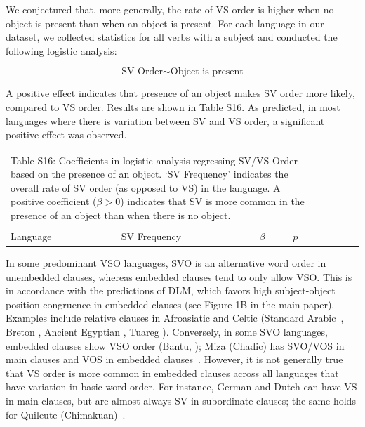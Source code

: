 \documentclass[11pt,a4paper]{article}
\begin{document}

We conjectured that, more generally, the rate of VS order is higher when no object is present than when an object is present.
For each language in our dataset, we collected statistics for all verbs with a subject and conducted the following logistic analysis:

\begin{equation}
\text{SV Order} \sim \text{Object is present}
\end{equation}

A positive effect indicates that presence of an object makes SV order more likely, compared to VS order.
Results are shown in Table S16.
As predicted, in most languages where there is variation between SV and VS order, a significant positive effect was observed.

\begin{longtable}{l|lllllll}
	\multicolumn{4}{p{0.8\textwidth}}{Table S16: Coefficients in logistic analysis regressing SV/VS Order based on the presence of an object. `SV Frequency' indicates the overall rate of SV order (as opposed to VS) in the language. A positive coefficient ($\beta > 0$) indicates that SV is more common in the presence of an object than when there is no object.}
	\\
		\multicolumn{4}{p{0.8\textwidth}}{}\\
Language & SV Frequency & $\beta$ & $p$ \\ \hline

\end{longtable}




In some predominant VSO languages, SVO is an alternative word order in unembedded clauses, whereas embedded clauses tend to only allow VSO.
This is in accordance with the predictions of DLM, which favors high subject-object position congruence in embedded clauses (see Figure 1B in the main paper).
Examples include relative clauses in Afroasiatic and Celtic (Standard Arabic~\citep{alqurashi:2012}, Breton \citep[][p. 80]{timm1988relative}, Ancient Egyptian \citep{gardiner1957egyptian}, Tuareg \citep[Chapter 12.1.2]{heath2005a}).
Conversely, in some SVO languages, embedded clauses show VSO order (Bantu, \citet{demuth1999verb}); Miza (Chadic) has SVO/VOS in main clauses and VOS in embedded clauses~\citep{wals-81}.
However, it is not generally true that VS order is more common in embedded clauses across all languages that have variation in basic word order.
For instance, German and Dutch can have VS in main clauses, but are almost always SV in subordinate clauses; the same holds for Quileute (Chimakuan)~\citep{wals-81}.
\end{document}
